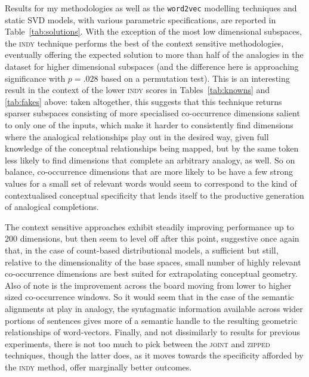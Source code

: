 Results for my methodologies as well as the \texttt{word2vec} modelling techniques and static SVD models, with various parametric specifications, are reported in Table~\ref{tab:solutions}.  With the exception of the most low dimensional subspaces, the \textsc{indy} technique performs the best of the context sensitive methodologies, eventually offering the expected solution to more than half of the analogies in the dataset for higher dimensional subspaces (and the difference here is approaching significance with $p = .028$ based on a permutation test).  This is an interesting result in the context of the lower \textsc{indy} scores in Tables~\ref{tab:knowns} and \ref{tab:fakes} above: taken altogether, this suggests that this technique returns sparser subspaces consisting of more specialised co-occurrence dimensions salient to only one of the inputs, which make it harder to consistently find dimensions where the analogical relationships play out in the desired way, given full knowledge of the conceptual relationships being mapped, but by the same token less likely to find dimensions that complete an arbitrary analogy, as well.  So on balance, co-occurrence dimensions that are more likely to be have a few strong values for a small set of relevant words would seem to correspond to the kind of contextualised conceptual specificity that lends itself to the productive generation of analogical completions.

The context sensitive approaches exhibit steadily improving performance up to 200 dimensions, but then seem to level off after this point, suggestive once again that, in the case of count-based distributional models, a sufficient but still, relative to the dimensionality of the base spaces, small number of highly relevant co-occurrence dimensions are best suited for extrapolating conceptual geometry.  Also of note is the improvement across the board moving from lower to higher sized co-occurrence windows.  So it would seem that in the case of the semantic alignments at play in analogy, the syntagmatic information available across wider portions of sentences gives more of a semantic handle to the resulting geometric relationships of word-vectors.  Finally, and not dissimilarly to results for previous experiments, there is not too much to pick between the \textsc{joint} and \textsc{zipped} techniques, though the latter does, as it moves towards the specificity afforded by the \textsc{indy} method, offer marginally better outcomes.


